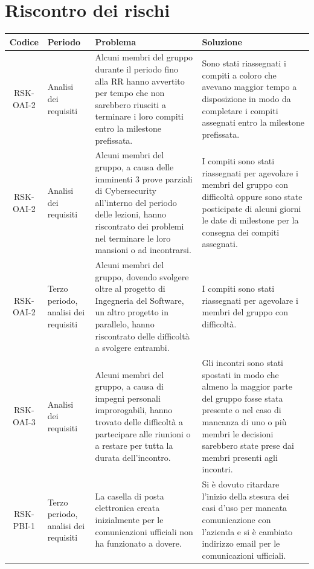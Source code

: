 \appendix
{}

	\section{Riscontro dei rischi}

		\begin{center}
			\begin{longtable}{|c|p{3cm}|p{4cm}|p{4cm}|}
			\hline
			\rowcolor{lighter-grayer}
			\textbf{Codice} & \textbf{Periodo} & \textbf{Problema} & \textbf{Soluzione} \\
			\hline
			\endfirsthead

			\hline
			RSK-OAI-2 & Analisi dei requisiti & Alcuni membri del gruppo durante il periodo fino alla RR hanno avvertito per tempo che non sarebbero riusciti a terminare i loro compiti entro la milestone prefissata. & Sono stati riassegnati i compiti a coloro che avevano maggior tempo a disposizione in modo da completare i compiti assegnati entro la milestone prefissata. \\
			\hline
			RSK-OAI-2 & Analisi dei requisiti & Alcuni membri del gruppo, a causa delle imminenti 3 prove parziali di Cybersecurity all'interno del periodo delle lezioni, hanno riscontrato dei problemi nel terminare le loro mansioni o ad incontrarsi. & I compiti sono stati riassegnati per agevolare i membri del gruppo con difficoltà oppure sono state posticipate di alcuni giorni le date di milestone per la consegna dei compiti assegnati.  \\
			\hline
			RSK-OAI-2 & Terzo periodo, analisi dei requisiti & Alcuni membri del gruppo, dovendo svolgere oltre al progetto di Ingegneria del Software, un altro progetto in parallelo, hanno riscontrato delle difficoltà a svolgere entrambi. & I compiti sono stati riassegnati per agevolare i membri del gruppo con difficoltà.  \\
			\hline
			RSK-OAI-3 & Analisi dei requisiti & Alcuni membri del gruppo, a causa di impegni personali improrogabili, hanno trovato delle difficoltà a partecipare alle riunioni o a restare per tutta la durata dell'incontro. & Gli incontri sono stati spostati in modo che almeno la maggior parte del gruppo fosse stata presente o nel caso di mancanza di uno o più membri le decisioni sarebbero state prese dai membri presenti agli incontri. \\
			\hline
			RSK-PBI-1 & Terzo periodo, analisi dei requisiti & La casella di posta elettronica creata inizialmente per le comunicazioni ufficiali non ha funzionato a dovere. & Si è dovuto ritardare l'inizio della stesura dei casi d'uso per mancata comunicazione con l'azienda e si è cambiato indirizzo email per le comunicazioni ufficiali. \\

\end{longtable}
\end{center}
